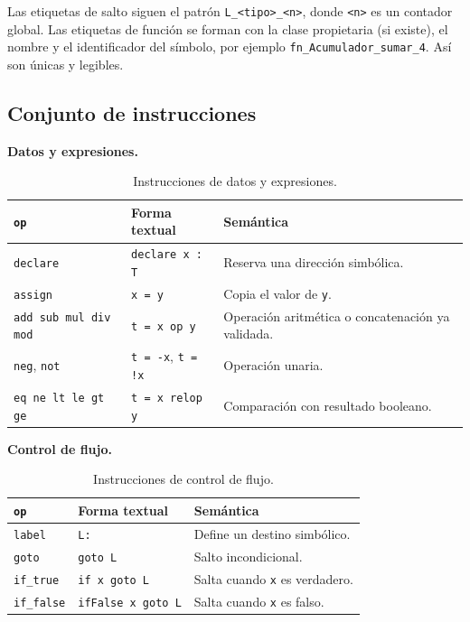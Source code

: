 \documentclass[11pt,a4paper]{article}
\newcommand{\subhead}[1]{\par\medskip\noindent\textbf{#1}\par\nopagebreak\smallskip}
\begin{document}
Las etiquetas de salto siguen el patrón \texttt{L\_<tipo>\_<n>}, donde \texttt{<n>}
es un contador global. Las etiquetas de función se forman con la clase
propietaria (si existe), el nombre y el identificador del símbolo, por ejemplo
\texttt{fn\_Acumulador\_sumar\_4}. Así son únicas y legibles.

\subsection{Conjunto de instrucciones}

\subhead{Datos y expresiones.}

\begin{table}[H]
\centering
\small
\begin{tabular}{@{}L{3.6cm}L{3.3cm}L{7.5cm}@{}}
\toprule
\textbf{\texttt{op}} & \textbf{Forma textual} & \textbf{Semántica} \\
\midrule
\texttt{declare} & \texttt{declare x : T} & Reserva una dirección simbólica. \\
\texttt{assign} & \texttt{x = y} & Copia el valor de \texttt{y}. \\
\texttt{add sub mul div mod} & \texttt{t = x op y} & Operación aritmética o
concatenación ya validada. \\
\texttt{neg}, \texttt{not} & \texttt{t = -x}, \texttt{t = !x} & Operación unaria. \\
\texttt{eq ne lt le gt ge} & \texttt{t = x relop y} & Comparación con resultado
booleano. \\
\bottomrule
\end{tabular}
\caption{Instrucciones de datos y expresiones.}
\end{table}

\subhead{Control de flujo.}

\begin{table}[H]
\centering
\small
\begin{tabular}{@{}L{3.6cm}L{3.9cm}L{6.9cm}@{}}
\toprule
\textbf{\texttt{op}} & \textbf{Forma textual} & \textbf{Semántica} \\
\midrule
\texttt{label} & \texttt{L:} & Define un destino simbólico. \\
\texttt{goto} & \texttt{goto L} & Salto incondicional. \\
\texttt{if\_true} & \texttt{if x goto L} & Salta cuando \texttt{x} es verdadero. \\
\texttt{if\_false} & \texttt{ifFalse x goto L} & Salta cuando \texttt{x} es falso. \\
\bottomrule
\end{tabular}
\caption{Instrucciones de control de flujo.}
\end{table}
\end{document}
